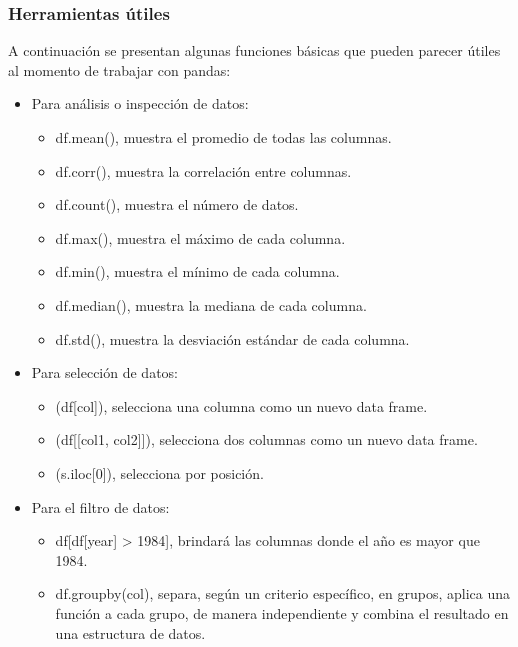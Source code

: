\documentclass[a4paper]{article}
\begin{document}
\subsubsection{Herramientas útiles}
A continuación se presentan algunas funciones básicas que pueden parecer útiles al momento de trabajar con pandas:
\begin{itemize}

\item Para análisis o inspección de datos: 
\begin{itemize}
\item df.mean(), muestra el promedio de todas las columnas.
\item df.corr(), muestra la correlación entre columnas.
\item df.count(), muestra el número de datos.
\item df.max(), muestra el máximo de cada columna.
\item df.min(), muestra el mínimo de cada columna.
\item df.median(), muestra la mediana de cada columna.
\item df.std(), muestra la desviación estándar de cada columna.
\end{itemize}

\item Para selección de datos:
\begin{itemize}
\item (df[col]), selecciona una columna como un nuevo data frame.
\item (df[[col1, col2]]), selecciona dos columnas como un nuevo data frame.
\item (s.iloc[0]), selecciona por posición.
\end{itemize}

\item Para el filtro de datos: 
\begin{itemize}
\item df[df[year] > 1984], brindará las columnas donde el año es mayor que 1984.
\item df.groupby(col), separa, según un criterio específico, en grupos, aplica una función a cada grupo, de manera independiente y combina el resultado en una estructura de datos. 
\end{itemize}

\end{itemize}
\end{document}
